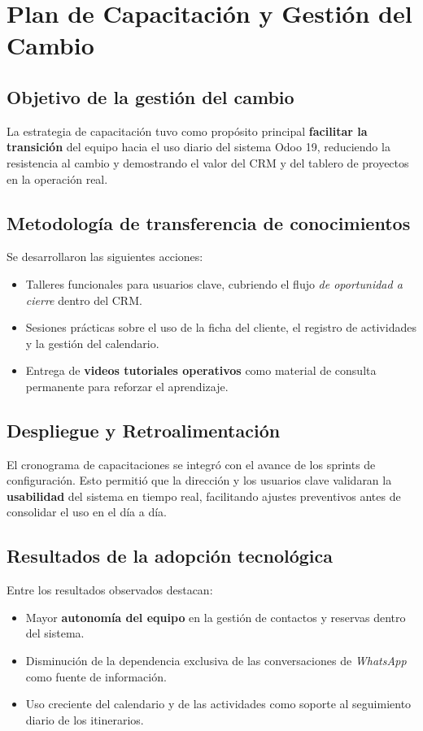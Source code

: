 \section{Plan de Capacitación y Gestión del Cambio}

\subsection{Objetivo de la gestión del cambio}

La estrategia de capacitación tuvo como propósito principal \textbf{facilitar la transición} del equipo hacia el uso diario del sistema Odoo 19, reduciendo la resistencia al cambio y demostrando el valor del CRM y del tablero de proyectos en la operación real.

\subsection{Metodología de transferencia de conocimientos}

Se desarrollaron las siguientes acciones:

\begin{itemize}
    \item Talleres funcionales para usuarios clave, cubriendo el flujo \textit{de oportunidad a cierre} dentro del CRM.
    \item Sesiones prácticas sobre el uso de la ficha del cliente, el registro de actividades y la gestión del calendario.
    \item Entrega de \textbf{videos tutoriales operativos} como material de consulta permanente para reforzar el aprendizaje.
\end{itemize}

\subsection{Despliegue y Retroalimentación}

El cronograma de capacitaciones se integró con el avance de los sprints de configuración. Esto permitió que la dirección y los usuarios clave validaran la \textbf{usabilidad} del sistema en tiempo real, facilitando ajustes preventivos antes de consolidar el uso en el día a día.

\subsection{Resultados de la adopción tecnológica}

Entre los resultados observados destacan:

\begin{itemize}
    \item Mayor \textbf{autonomía del equipo} en la gestión de contactos y reservas dentro del sistema.
    \item Disminución de la dependencia exclusiva de las conversaciones de \textit{WhatsApp} como fuente de información.
    \item Uso creciente del calendario y de las actividades como soporte al seguimiento diario de los itinerarios.
\end{itemize}

